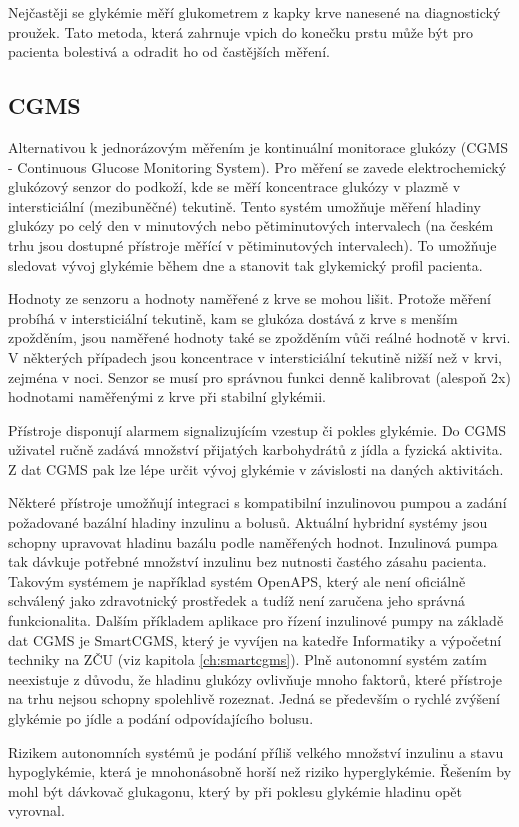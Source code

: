 Nejčastěji se glykémie měří glukometrem z kapky krve nanesené na diagnostický proužek. Tato metoda, která zahrnuje vpich do konečku prstu může být pro pacienta bolestivá a odradit ho od častějších měření. \cite{Diabetes.Pelikan}

\subsection{CGMS}
\label{ch:cgms}

Alternativou k jednorázovým měřením je kontinuální monitorace glukózy (CGMS - Continuous Glucose Monitoring System). Pro měření se zavede elektrochemický glukózový senzor do podkoží, kde se měří koncentrace glukózy v plazmě v intersticiální (mezibuněčné) tekutině. Tento systém umožňuje měření hladiny glukózy po celý den v minutových nebo pětiminutových intervalech (na českém trhu jsou dostupné přístroje měřící v pětiminutových intervalech). To umožňuje sledovat vývoj glykémie během dne a stanovit tak glykemický profil pacienta.

Hodnoty ze senzoru a hodnoty naměřené z krve se mohou lišit. Protože měření probíhá v intersticiální tekutině, kam se glukóza dostává z krve s menším zpožděním, jsou naměřené hodnoty také se zpožděním vůči reálné hodnotě v krvi. V některých případech jsou koncentrace v intersticiální tekutině nižší než v krvi, zejména v noci. Senzor se musí pro správnou funkci denně kalibrovat (alespoň 2x) hodnotami naměřenými z krve při stabilní glykémii. \citep{Diabetes.Perusicova}

Přístroje disponují alarmem signalizujícím vzestup či pokles glykémie. Do CGMS uživatel ručně zadává množství přijatých karbohydrátů z jídla a fyzická aktivita. Z dat CGMS pak lze lépe určit vývoj glykémie v závislosti na daných aktivitách.

Některé přístroje umožňují integraci s kompatibilní inzulinovou pumpou a zadání požadované bazální hladiny inzulinu a bolusů. Aktuální hybridní systémy jsou schopny upravovat hladinu bazálu podle naměřených hodnot. Inzulinová pumpa tak dávkuje potřebné množství inzulinu bez nutnosti častého zásahu pacienta. Takovým systémem je například systém OpenAPS, který ale není oficiálně schválený jako zdravotnický prostředek a tudíž není zaručena jeho správná funkcionalita. Dalším příkladem aplikace pro řízení inzulinové pumpy na základě dat CGMS je SmartCGMS, který je vyvíjen na katedře Informatiky a výpočetní techniky na ZČU (viz kapitola \ref{ch:smartcgms}). Plně autonomní systém zatím neexistuje z důvodu, že hladinu glukózy ovlivňuje mnoho faktorů, které přístroje na trhu nejsou schopny spolehlivě rozeznat. Jedná se především o rychlé zvýšení glykémie po jídle a podání odpovídajícího bolusu.

Rizikem autonomních systémů je podání příliš velkého množství inzulinu a stavu hypoglykémie, která je mnohonásobně horší než riziko hyperglykémie. Řešením by mohl být dávkovač glukagonu, který by při poklesu glykémie hladinu opět vyrovnal. %